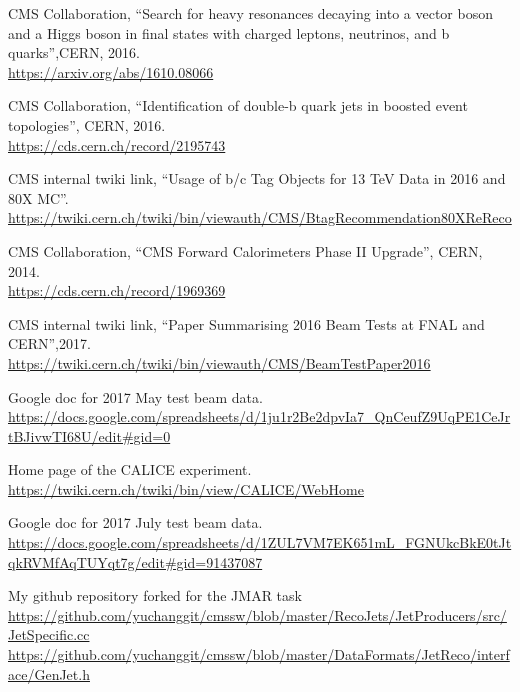 \documentclass{article}
\begin{document}
\begin{thebibliography}{9}

CMS Collaboration, ``Search for heavy resonances decaying into a vector boson and a Higgs boson in final states with charged leptons, neutrinos, and b quarks'',CERN, 2016.\\
\url{https://arxiv.org/abs/1610.08066}

CMS Collaboration, ``Identification of double-b quark jets in boosted event topologies'', CERN, 2016.\\
\url{https://cds.cern.ch/record/2195743}

CMS internal twiki link, ``Usage of b/c Tag Objects for 13 TeV Data in 2016 and 80X MC''.\\
\url{https://twiki.cern.ch/twiki/bin/viewauth/CMS/BtagRecommendation80XReReco}

CMS Collaboration, ``CMS Forward Calorimeters Phase II Upgrade'', CERN, 2014.\\
\url{https://cds.cern.ch/record/1969369}

CMS internal twiki link, ``Paper Summarising 2016 Beam Tests at FNAL and CERN'',2017.\\
\url{https://twiki.cern.ch/twiki/bin/viewauth/CMS/BeamTestPaper2016}

Google doc for 2017 May test beam data.\\
\url{https://docs.google.com/spreadsheets/d/1ju1r2Be2dpvIa7_QnCeufZ9UqPE1CeJrtBJivwTI68U/edit#gid=0}

Home page of the CALICE experiment.\\
\url{https://twiki.cern.ch/twiki/bin/view/CALICE/WebHome}

Google doc for 2017 July test beam data.\\
\url{https://docs.google.com/spreadsheets/d/1ZUL7VM7EK651mL_FGNUkcBkE0tJtqkRVMfAqTUYqt7g/edit#gid=91437087} 

My github repository forked for the JMAR task\\
\url{https://github.com/yuchanggit/cmssw/blob/master/RecoJets/JetProducers/src/JetSpecific.cc}\\
\url{https://github.com/yuchanggit/cmssw/blob/master/DataFormats/JetReco/interface/GenJet.h}

\end{thebibliography}
\end{document}
